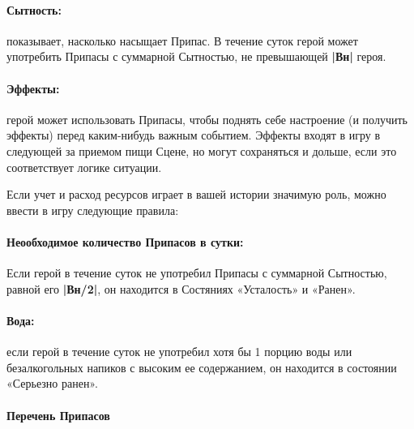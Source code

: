 \paragraph{Сытность:} показывает, насколько насыщает Припас. В течение суток герой может употребить Припасы с суммарной Сытностью, не превышающей \textbf{|Вн|} героя.
\paragraph{Эффекты:} герой может использовать Припасы, чтобы поднять себе настроение (и получить эффекты) перед каким-нибудь важным событием. Эффекты входят в игру в следующей за приемом пищи Сцене, но могут сохраняться и дольше, если это соответствует логике ситуации.
\begin{tcolorbox}
    Если учет и расход ресурсов играет в вашей истории значимую роль, можно ввести в игру следующие правила:
    \paragraph{Неообходимое количество Припасов в сутки:} Если герой в течение суток не употребил Припасы с суммарной Сытностью, равной его \textbf{|Вн/2|}, он находится в Состяниях «Усталость» и «Ранен».
    \paragraph{Вода:} если герой в течение суток не употребил хотя бы 1 порцию воды или безалкогольных напиков с высоким ее содержанием, он находится в состоянии «Серьезно ранен».
\end{tcolorbox}
\paragraph{Перечень Припасов}

\earlyEnd

\earlyEnd

\earlyEnd

